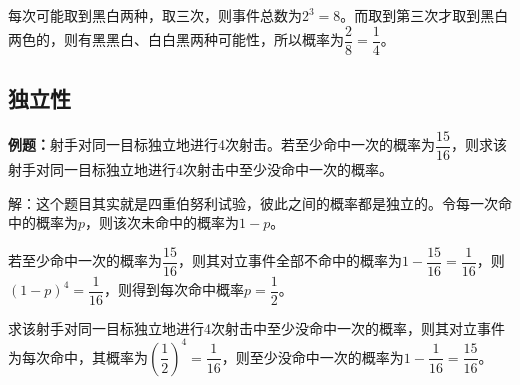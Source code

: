 每次可能取到黑白两种，取三次，则事件总数为$2^3=8$。而取到第三次才取到黑白两色的，则有黑黑白、白白黑两种可能性，所以概率为$\dfrac{2}{8}=\dfrac{1}{4}$。

\subsection{独立性}

\textbf{例题：}射手对同一目标独立地进行4次射击。若至少命中一次的概率为$\dfrac{15}{16}$，则求该射手对同一目标独立地进行4次射击中至少没命中一次的概率。

解：这个题目其实就是四重伯努利试验，彼此之间的概率都是独立的。令每一次命中的概率为$p$，则该次未命中的概率为$1-p$。

若至少命中一次的概率为$\dfrac{15}{16}$，则其对立事件全部不命中的概率为$1-\dfrac{15}{16}=\dfrac{1}{16}$，则$(1-p)^4=\dfrac{1}{16}$，则得到每次命中概率$p=\dfrac{1}{2}$。

求该射手对同一目标独立地进行4次射击中至少没命中一次的概率，则其对立事件为每次命中，其概率为$\left(\dfrac{1}{2}\right)^4=\dfrac{1}{16}$，则至少没命中一次的概率为$1-\dfrac{1}{16}=\dfrac{15}{16}$。
